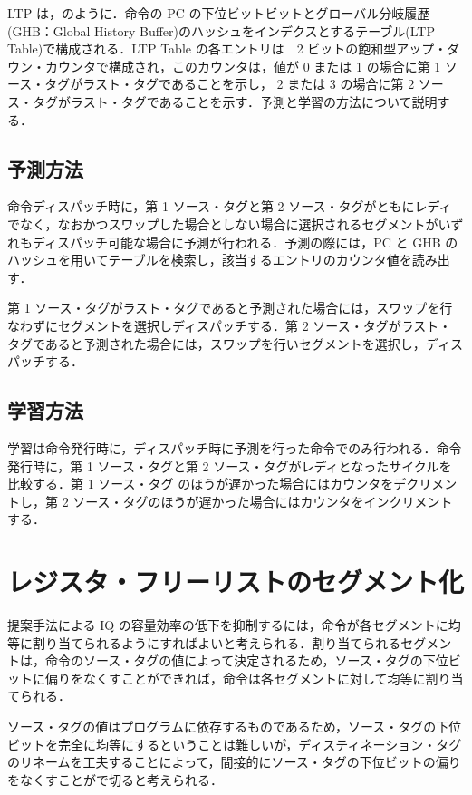 LTP は，のように．命令の PC の下位ビットビットとグローバル分岐履歴(GHB：Global History Buffer)のハッシュをインデクスとするテーブル(LTP Table)で構成される．LTP Table の各エントリは　2 ビットの飽和型アップ・ダウン・カウンタで構成され，このカウンタは，値が 0 または 1 の場合に第 1 ソース・タグがラスト・タグであることを示し， 2 または 3 の場合に第 2 ソース・タグがラスト・タグであることを示す．予測と学習の方法について説明する．
  
\subsection{予測方法}
命令ディスパッチ時に，第 1 ソース・タグと第 2 ソース・タグがともにレディでなく，なおかつスワップした場合としない場合に選択されるセグメントがいずれもディスパッチ可能な場合に予測が行われる．予測の際には，PC と GHB のハッシュを用いてテーブルを検索し，該当するエントリのカウンタ値を読み出す．

第 1 ソース・タグがラスト・タグであると予測された場合には，スワップを行なわずにセグメントを選択しディスパッチする．第 2 ソース・タグがラスト・タグであると予測された場合には，スワップを行いセグメントを選択し，ディスパッチする．
  

\subsection{学習方法}
学習は命令発行時に，ディスパッチ時に予測を行った命令でのみ行われる．命令発行時に，第 1 ソース・タグと第 2 ソース・タグがレディとなったサイクルを比較する．第 1 ソース・タグ のほうが遅かった場合にはカウンタをデクリメントし，第 2 ソース・タグのほうが遅かった場合にはカウンタをインクリメントする．

\section{レジスタ・フリーリストのセグメント化}
提案手法による IQ の容量効率の低下を抑制するには，命令が各セグメントに均等に割り当てられるようにすればよいと考えられる．割り当てられるセグメントは，命令のソース・タグの値によって決定されるため，ソース・タグの下位ビットに偏りをなくすことができれば，命令は各セグメントに対して均等に割り当てられる．

ソース・タグの値はプログラムに依存するものであるため，ソース・タグの下位ビットを完全に均等にするということは難しいが，ディスティネーション・タグのリネームを工夫することによって，間接的にソース・タグの下位ビットの偏りをなくすことがで切ると考えられる．

